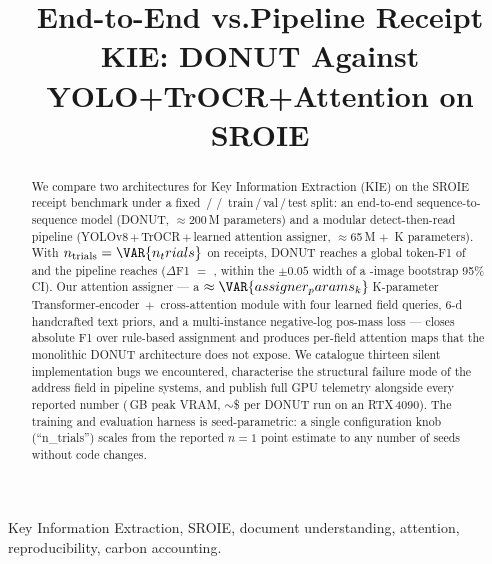 \documentclass[conference]{IEEEtran}
\begin{document}
\title{End-to-End vs.\@ Pipeline Receipt KIE: DONUT
       Against YOLO+TrOCR+Attention on SROIE}

\author{
}

\maketitle

\begin{IEEEkeywords}
Key Information Extraction, SROIE, document understanding,
attention, reproducibility, carbon accounting.
\end{IEEEkeywords}

\begin{abstract}
We compare two architectures for Key Information Extraction (KIE) on
the SROIE receipt benchmark under a fixed
\,/\,\,/\,
train\,/\,val\,/\,test split: an end-to-end sequence-to-sequence
model (DONUT, $\approx$200\,M parameters) and a modular
detect-then-read pipeline (YOLOv8\,$+$\,TrOCR\,$+$\,learned attention
assigner, $\approx$65\,M $+$ \,K parameters).
With $n_{\text{trials}}=\VAR{n_trials}$ on  receipts, DONUT
reaches a global token-F1 of  and the
pipeline reaches 
($\Delta$F1 $=$ , within the
$\pm 0.05$ width of a -image bootstrap 95\% CI).  Our attention
assigner --- a $\approx\VAR{assigner_params_k}\,$K-parameter
Transformer-encoder~$+$~cross-attention module with four learned
field queries, 6-d handcrafted text priors, and a multi-instance
negative-log pos-mass loss --- closes  absolute
F1 over rule-based assignment and produces per-field attention maps
that the monolithic DONUT architecture does not expose.  We
catalogue thirteen silent implementation bugs we encountered,
characterise the structural failure mode of the address field in
pipeline systems, and publish full GPU telemetry alongside every
reported number (\,GB peak VRAM,
$\sim$\$ per DONUT run on an RTX\,4090).  The
training and evaluation harness is seed-parametric: a single
configuration knob (``n\_trials'') scales from the reported
$n{=}1$ point estimate to any number of seeds without code changes.
\end{abstract}



















\end{document}
